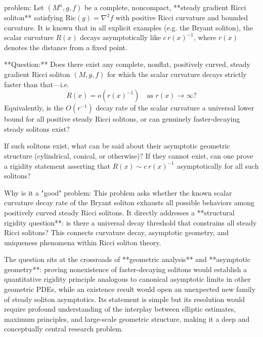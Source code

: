problem:  
Let \((M^n, g, f)\) be a complete, noncompact, **steady gradient Ricci soliton** satisfying \(\mathrm{Ric}(g) = \nabla^2 f\) with positive Ricci curvature and bounded curvature.  
It is known that in all explicit examples (e.g. the Bryant soliton), the scalar curvature \(R(x)\) decays asymptotically like \(c\, r(x)^{-1}\), where \(r(x)\) denotes the distance from a fixed point.  

**Question:**  
Does there exist any complete, nonflat, positively curved, steady gradient Ricci soliton \((M, g, f)\) for which the scalar curvature decays strictly faster than that—i.e.  
\[
R(x) = o(r(x)^{-1}) \quad \text{as } r(x)\to\infty?
\]  
Equivalently, is the \(O(r^{-1})\) decay rate of the scalar curvature a universal lower bound for all positive steady Ricci solitons, or can genuinely faster-decaying steady solitons exist?  

If such solitons exist, what can be said about their asymptotic geometric structure (cylindrical, conical, or otherwise)? If they cannot exist, can one prove a rigidity statement asserting that \(R(x)\sim c\,r(x)^{-1}\) asymptotically for all such solitons?

Why is it a "good" problem:  
This problem asks whether the known scalar curvature decay rate of the Bryant soliton exhausts all possible behaviors among positively curved steady Ricci solitons. It directly addresses a **structural rigidity question**: is there a universal decay threshold that constrains all steady Ricci solitons? This connects curvature decay, asymptotic geometry, and uniqueness phenomena within Ricci soliton theory.  

The question sits at the crossroads of **geometric analysis** and **asymptotic geometry**: proving nonexistence of faster-decaying solitons would establish a quantitative rigidity principle analogous to canonical asymptotic limits in other geometric PDEs, while an existence result would open an unexpected new family of steady soliton asymptotics. Its statement is simple but its resolution would require profound understanding of the interplay between elliptic estimates, maximum principles, and large-scale geometric structure, making it a deep and conceptually central research problem.